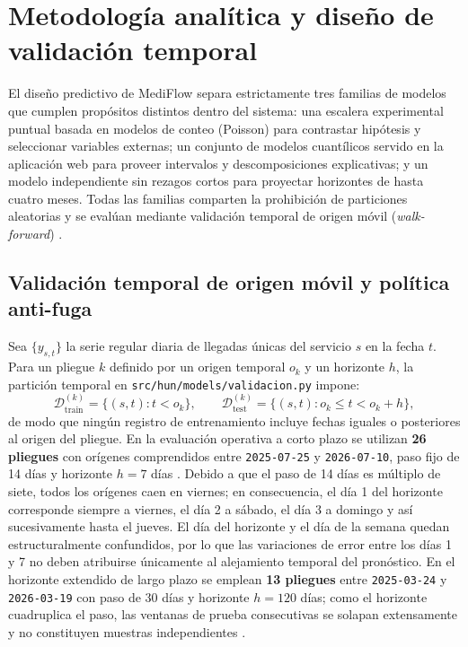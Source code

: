
\section{Metodología analítica y diseño de validación temporal}

El diseño predictivo de MediFlow separa estrictamente tres familias de modelos que cumplen propósitos distintos dentro del sistema: una escalera experimental puntual basada en modelos de conteo (Poisson) para contrastar hipótesis y seleccionar variables externas; un conjunto de modelos cuantílicos servido en la aplicación web para proveer intervalos y descomposiciones explicativas; y un modelo independiente sin rezagos cortos para proyectar horizontes de hasta cuatro meses. Todas las familias comparten la prohibición de particiones aleatorias y se evalúan mediante validación temporal de origen móvil (\textit{walk-forward}) \parencite{hyndman_fpp3}.

\subsection{Validación temporal de origen móvil y política anti-fuga}

Sea $\{y_{s,t}\}$ la serie regular diaria de llegadas únicas del servicio $s$ en la fecha $t$. Para un pliegue $k$ definido por un origen temporal $o_k$ y un horizonte $h$, la partición temporal en \texttt{src/hun/models/validacion.py} impone:
\begin{equation}
\label{eq:walk_forward}
\mathcal{D}_{\text{train}}^{(k)} = \{(s, t) : t < o_k\}, \qquad
\mathcal{D}_{\text{test}}^{(k)} = \{(s, t) : o_k \le t < o_k + h\},
\end{equation}
de modo que ningún registro de entrenamiento incluye fechas iguales o posteriores al origen del pliegue. En la evaluación operativa a corto plazo se utilizan \textbf{26 pliegues} con orígenes comprendidos entre \texttt{2025-07-25} y \texttt{2026-07-10}, paso fijo de 14 días y horizonte $h = 7$ días \parencite{mediflow2026demanda}. Debido a que el paso de 14 días es múltiplo de siete, todos los orígenes caen en viernes; en consecuencia, el día 1 del horizonte corresponde siempre a viernes, el día 2 a sábado, el día 3 a domingo y así sucesivamente hasta el jueves. El día del horizonte y el día de la semana quedan estructuralmente confundidos, por lo que las variaciones de error entre los días 1 y 7 no deben atribuirse únicamente al alejamiento temporal del pronóstico. En el horizonte extendido de largo plazo se emplean \textbf{13 pliegues} entre \texttt{2025-03-24} y \texttt{2026-03-19} con paso de 30 días y horizonte $h = 120$ días; como el horizonte cuadruplica el paso, las ventanas de prueba consecutivas se solapan extensamente y no constituyen muestras independientes \parencite{mediflow2026largoplazo}.

